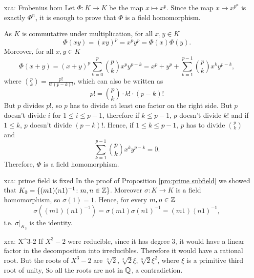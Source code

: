 \begin{sol}{xca: Frobenius hom}
Let $\Phi: K\to K$ be the map 
$x\mapsto x^{p}$.
Since the map $x\mapsto x^{p^n}$
is exactly $\Phi^n$,
it is enough to prove that $\Phi$ is a field homomorphism.

As $K$ is commutative under multiplication, 
for all $x,y \in K$ 
        \[
        \Phi(xy) = (xy)^p = x^py^p = \Phi(x) \Phi(y).
        \]
Moreover, for all $x,y \in K$ 
\[
\Phi(x+y) =
(x+y)^p \sum_{k=0}^p \binom{p}{k}x^py^{p-k}=
x^p + y^p + \sum_{k=1}^{p-1} \binom{p}{k}x^ky^{p-k} ,
\]
where $\binom{p}{k} = \frac{p!}{k!(p-k)!}$,
which can also be written as
        \[
        p! = \binom{p}{k} \cdot k! \cdot (p-k)!
        \]
But $p$ divides $p!$, so $p$
has to divide at least one 
factor on the right side. 
But $p$ doesn't divide $i$
 for $1 \leq i \leq p-1$, therefore if $k \leq p-1$, $p$ doesn't divide
$k!$ and if $1 \leq  k$, $p$ doesn't divide $(p-k)!$. 
Hence, if $1 \leq k \leq p-1$, $p$ has to divide $\binom{p}{k}$ and 
\[
\sum_{k=1}^{p-1} \binom{p}{k}x^ky^{p-k}=0.
\]
Therefore, $\Phi$ is a field homomorphism.
\end{sol}

\begin{sol}{xca: prime field is fixed}
    In the proof of Proposition \ref{pro:prime subfield}
    we showed that 
    $K_0=\{(m1)(n1)^{-1}\colon m,n\in \mathbb{Z}\}$.
    Moreover $\sigma:K\to K$ is a field homomorphism,
    so  $\sigma(1)=1$.
    Hence, for every $m,n\in\mathbb{Z}$
    \[
    \sigma\left((m1)(n1)^{-1}\right)=\sigma(m1)\sigma(n1)^{-1}=(m1)(n1)^{-1},
    \]
    i.e. $\sigma|_{K_0}$ is the identity.
\end{sol}

\begin{sol}{xca: X^3-2}
    If $X^3-2$ were reducible, since it has degree 3,
    it would have a linear
    factor in the decomposition into irreducibles.
    Therefore it would have a rational root.
    But the roots of $X^3-2$ are $\sqrt[3]{2},\sqrt[3]{2}\xi,\sqrt[3]{2}\xi^2$,
    where $\xi$ is a primitive third root of unity,
    So all the roots are not in $\mathbb{Q}$, a contradiction.
\end{sol}


